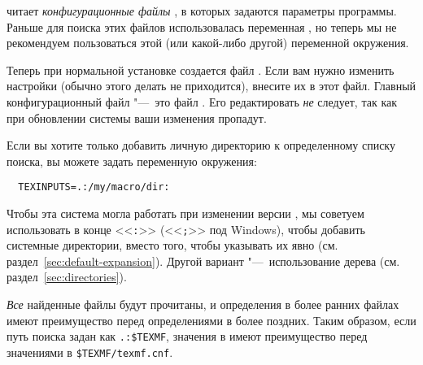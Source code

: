 \documentclass{article}
\renewcommand{\samp}[1]{<<\texttt{#1}>>}
\begin{document}
\begingroup{}
\KPS{} читает \emph{конфигурационные файлы} , в
которых задаются параметры программы.  Раньше для поиска этих файлов
использовалась переменная , но теперь мы не
рекомендуем пользоваться этой (или какой-либо другой) переменной
окружения.

Теперь при нормальной установке создается файл
.  Если вам нужно изменить настройки (обычно
этого делать не приходится), внесите их в этот файл.  Главный
конфигурационный файл "---~это файл  .
Его редактировать \emph{не} следует, так как при обновлении системы
ваши изменения пропадут. 

Если вы хотите только добавить личную директорию к определенному
списку поиска, вы можете задать переменную окружения:
\begin{verbatim}
  TEXINPUTS=.:/my/macro/dir:
\end{verbatim}
Чтобы эта система могла работать при изменении версии \TL, мы советуем
использовать в конце \samp{:} (\samp{;} под Windows), чтобы добавить
системные директории, вместо того, чтобы указывать их явно
(см. раздел~\ref{sec:default-expansion}).  Другой вариант
"---~использование дерева
 (см. раздел~\ref{sec:directories}).


\emph{Все} найденные файлы  будут прочитаны, и
определения в более ранних файлах имеют преимущество перед
определениями в более поздних. Таким образом, если путь поиска задан
как \verb|.:$TEXMF|, значения в  имеют преимущество
перед значениями в \verb|$TEXMF/texmf.cnf|.
\endgroup
\end{document}
